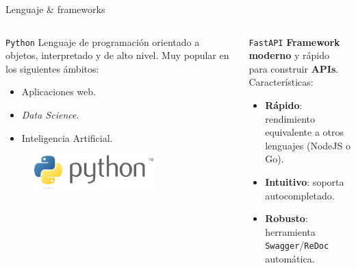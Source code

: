 \documentclass[aspectratio=169,xcolor=dvipsnames]{beamer}
\begin{document}
	
	\begin{frame}{Lenguaje \& frameworks}
		\begin{columns}
			\begin{column}{0.5\textwidth}
				\begin{exampleblock}{\texttt{Python}}
					Lenguaje de programación orientado a objetos, interpretado y de alto nivel. Muy popular en los siguientes ámbitos:
					
					\begin{itemize}
						\item Aplicaciones web.
						
						\item \textit{Data Science}.
						
						\item Inteligencia Artificial.
					\end{itemize}
					
					\begin{figure}[h!]
						\begin{center}
							\includegraphics[width=0.7\textwidth]{img/python_logo.png}
						\end{center}
					\end{figure}
				\end{exampleblock}
			\end{column}
		
			\begin{column}{0.5\textwidth}
				\begin{exampleblock}{\texttt{FastAPI}}
					\textbf{Framework moderno} y rápido para construir \textbf{APIs}. Características:
					
					\begin{itemize}
						\item \textbf{Rápido}: rendimiento equivalente a otros lenguajes (NodeJS o Go).
						\item \textbf{Intuitivo}: soporta autocompletado. 
						\item \textbf{Robusto}: herramienta \texttt{Swagger}/\texttt{ReDoc} automática.
					\end{itemize}
					

\end{exampleblock}
\end{column}
\end{columns}
\end{frame}
\end{document}

